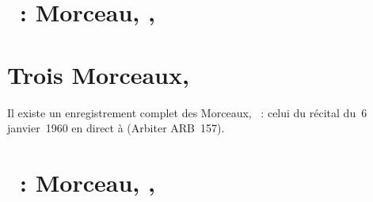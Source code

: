 \section{\ifChrono \Scriabine{}~: \fi
Morceau,  , }
\label{\thesection}

\begin{workitemize}
 \item{}
 \begin{perfitemize}
  \item{}
  \item{}
 \end{perfitemize}
\end{workitemize}

\section*{%
Trois Morceaux, }

Il existe un enregistrement complet des Morceaux, ~: celui du
récital du~6 janvier~1960 en direct à \MSHM (Arbiter ARB~157).

\section{\ifChrono \Scriabine{}~: \fi
Morceau,  , }
\label{\thesection}

